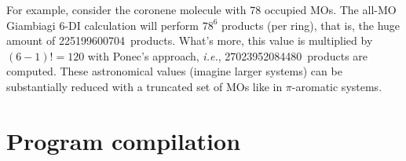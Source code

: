 \documentclass[a4paper,11pt,openany]{memoir}
\begin{document}
For example, consider the coronene molecule with 78 occupied \acp{MO}. The all-\ac{MO} Giambiagi 6-\ac{DI} calculation will perform $78^6$ products (per ring), that is, the huge amount of \SI{225199600704}{products}. What's more, this value is multiplied by $(6-1)!=120$ with Ponec's approach, \emph{i.e.}, \SI{27023952084480}{products} are computed. These astronomical values (imagine larger systems) can be substantially reduced with a truncated set of \acp{MO} like in $\pi$-aromatic systems.

\chapter{Program compilation}
\end{document}
